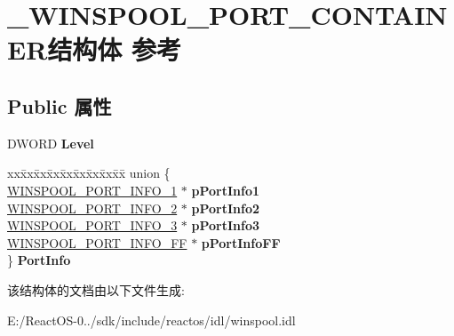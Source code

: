 \hypertarget{struct___w_i_n_s_p_o_o_l___p_o_r_t___c_o_n_t_a_i_n_e_r}{}\section{\+\_\+\+W\+I\+N\+S\+P\+O\+O\+L\+\_\+\+P\+O\+R\+T\+\_\+\+C\+O\+N\+T\+A\+I\+N\+E\+R结构体 参考}
\label{struct___w_i_n_s_p_o_o_l___p_o_r_t___c_o_n_t_a_i_n_e_r}
\subsection*{Public 属性}
\begin{DoxyCompactItemize}
\item 
\mbox{\label{struct___w_i_n_s_p_o_o_l___p_o_r_t___c_o_n_t_a_i_n_e_r_aed61fba91c341ad6f198b94b485e50e0}} 
D\+W\+O\+RD {\bfseries Level}
\item 
\mbox{\label{struct___w_i_n_s_p_o_o_l___p_o_r_t___c_o_n_t_a_i_n_e_r_a69cf87bc6358c482c620e73b8ed622df}} 
\begin{tabbing}
xx\=xx\=xx\=xx\=xx\=xx\=xx\=xx\=xx\=\kill
union \{\\
\>\hyperlink{struct___w_i_n_s_p_o_o_l___p_o_r_t___i_n_f_o__1}{WINSPOOL\_PORT\_INFO\_1} $\ast$ {\bfseries pPortInfo1}\\
\>\hyperlink{struct___w_i_n_s_p_o_o_l___p_o_r_t___i_n_f_o__2}{WINSPOOL\_PORT\_INFO\_2} $\ast$ {\bfseries pPortInfo2}\\
\>\hyperlink{struct___w_i_n_s_p_o_o_l___p_o_r_t___i_n_f_o__3}{WINSPOOL\_PORT\_INFO\_3} $\ast$ {\bfseries pPortInfo3}\\
\>\hyperlink{struct___w_i_n_s_p_o_o_l___p_o_r_t___i_n_f_o___f_f}{WINSPOOL\_PORT\_INFO\_FF} $\ast$ {\bfseries pPortInfoFF}\\
\} {\bfseries PortInfo}\\

\end{tabbing}\end{DoxyCompactItemize}


该结构体的文档由以下文件生成\+:\begin{DoxyCompactItemize}
\item 
E\+:/\+React\+O\+S-\/0../sdk/include/reactos/idl/winspool.\+idl\end{DoxyCompactItemize}
